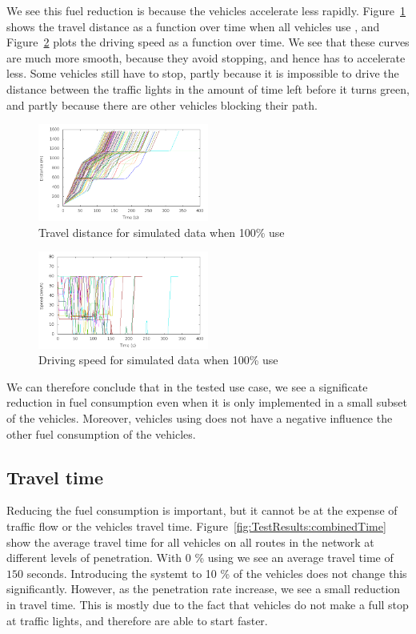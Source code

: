We see this fuel reduction is because the vehicles accelerate less rapidly. 
Figure~\ref{fig:TestResults:distance100} shows the travel distance as a function over time when all vehicles use \tech, and Figure~\ref{fig:TestResults:speed100} plots the driving speed as a function over time.
We see that these curves are much more smooth, because they avoid stopping, and hence has to accelerate less.
Some vehicles still have to stop, partly because it is impossible to drive the distance between the traffic lights in the amount of time left before it turns green, and partly because there are other vehicles blocking their path.
\begin{figure}[htb]
\includegraphics[width=0.5\textwidth]{../images/tp0c1_0/distanceControlled100.png}
\caption{Travel distance for simulated data when 100\% use \tech}
\label{fig:TestResults:distance100}
\end{figure}
\begin{figure}[htb]
\includegraphics[width=0.5\textwidth]{../images/tp0c1_0/speedControlled100.png}
\caption{Driving speed for simulated data when 100\% use \tech}
\label{fig:TestResults:speed100}
\end{figure}

We can therefore conclude that in the tested use case, we see a significate reduction in fuel consumption even when it is only implemented in a small subset of the vehicles. 
Moreover, vehicles using \tech does not have a negative influence the other fuel consumption of the vehicles.

\subsection{Travel time}
Reducing the fuel consumption is important, but it cannot be at the expense of traffic flow or the vehicles travel time.
Figure~\ref{fig:TestResults:combinedTime} show the average travel time for all vehicles on all routes in the network at different levels of penetration.
With 0 \% using \tech we see an average travel time of $150$ seconds. 
Introducing the systemt to 10 \% of the vehicles does not change this significantly. 
However, as the penetration rate increase, we see a small reduction in travel time. 
This is mostly due to the fact that vehicles do not make a full stop at traffic lights, and therefore are able to start faster.

